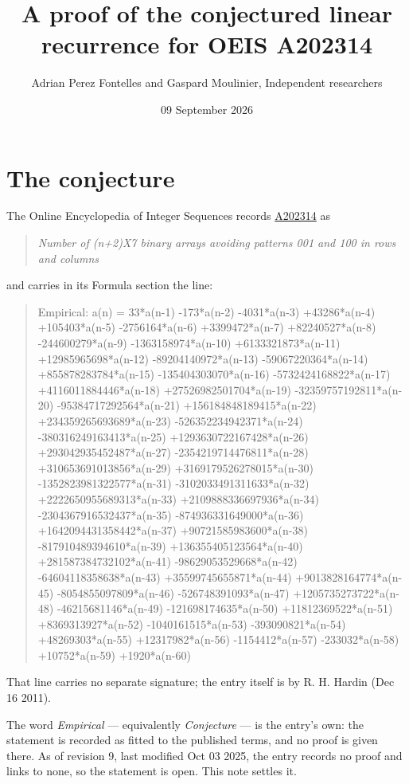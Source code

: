 \documentclass[11pt]{article}
\title{A proof of the conjectured linear recurrence for OEIS A202314}
\author{Adrian Perez Fontelles and Gaspard Moulinier, Independent researchers}
\date{09 September 2026}
\theoremstyle{definition}
\begin{document}
\maketitle
\section{The conjecture}

The Online Encyclopedia of Integer Sequences records \href{https://oeis.org/A202314}{A202314} as

\begin{quote}\itshape Number of (n+2)X7 binary arrays avoiding patterns 001 and 100 in rows and columns\end{quote}

and carries in its Formula section the line:

\begin{quote}\ttfamily Empirical: a(n) = 33*a(n-1) -173*a(n-2) -4031*a(n-3) +43286*a(n-4) +105403*a(n-5) -2756164*a(n-6) +3399472*a(n-7) +82240527*a(n-8) -244600279*a(n-9) -1363158974*a(n-10) +6133321873*a(n-11) +12985965698*a(n-12) -89204140972*a(n-13) -59067220364*a(n-14) +855878283784*a(n-15) -135404303070*a(n-16) -5732424168822*a(n-17) +4116011884446*a(n-18) +27526982501704*a(n-19) -32359757192811*a(n-20) -95384717292564*a(n-21) +156184848189415*a(n-22) +234359265693689*a(n-23) -526352234942371*a(n-24) -380316249163413*a(n-25) +1293630722167428*a(n-26) +293042935452487*a(n-27) -2354219714476811*a(n-28) +310653691013856*a(n-29) +3169179526278015*a(n-30) -1352823981322577*a(n-31) -3102033491311633*a(n-32) +2222650955689313*a(n-33) +2109888336697936*a(n-34) -2304367916532437*a(n-35) -874936331649000*a(n-36) +1642094431358442*a(n-37) +90721585983600*a(n-38) -817910489394610*a(n-39) +136355405123564*a(n-40) +281587384732102*a(n-41) -98629053529668*a(n-42) -64604118358638*a(n-43) +35599745655871*a(n-44) +9013828164774*a(n-45) -8054855097809*a(n-46) -526748391093*a(n-47) +1205735273722*a(n-48) -46215681146*a(n-49) -121698174635*a(n-50) +11812369522*a(n-51) +8369313927*a(n-52) -1040161515*a(n-53) -393090821*a(n-54) +48269303*a(n-55) +12317982*a(n-56) -1154412*a(n-57) -233032*a(n-58) +10752*a(n-59) +1920*a(n-60)\end{quote}

That line carries no separate signature; the entry itself is by R. H. Hardin (Dec 16 2011).

The word {\itshape Empirical} --- equivalently {\itshape Conjecture} --- is the entry's own: the statement is recorded as fitted to the published terms, and no proof is given there. As of revision 9, last modified Oct 03 2025, the entry records no proof and links to none, so the statement is open. This note settles it.
\end{document}
